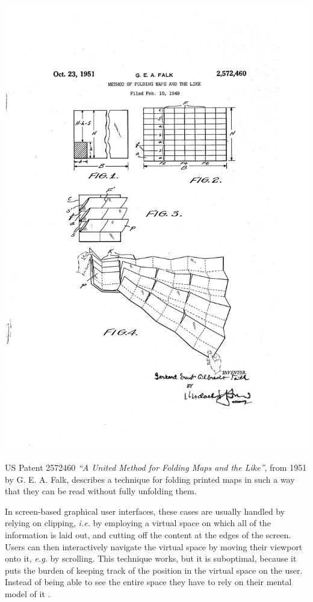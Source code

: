 \documentclass{tufte-book} %
\newcommand{\hairsp}{\hspace{1pt}} %
\newcommand{\ie}{\textit{i.\hairsp{}e.}\xspace} %
\newcommand{\eg}{\textit{e.\hairsp{}g.}\xspace} %
\begin{document}
\begin{marginfigure}
\includegraphics[width=\linewidth]{falk-patent.png}
\caption{US Patent 2572460 \emph{``A United Method for Folding Maps and the Like''}, from 1951 by G. E. A. Falk, describes a technique for folding printed maps in such a way that they can be read without fully unfolding them.}
\label{fig:falkmap}
\end{marginfigure}

In screen-based graphical user interfaces, these cases are usually handled by relying on clipping, \ie by employing a virtual space on which all of the information is laid out, and cutting off the content at the edges of the screen. Users can then interactively navigate the virtual space by moving their viewport onto it, \eg by scrolling. This technique works, but it is suboptimal, because it puts the burden of keeping track of the position in the virtual space on the user. Instead of being able to see the entire space they have to rely on their mental model of it \cite{bederson2011promise}.
\end{document}
